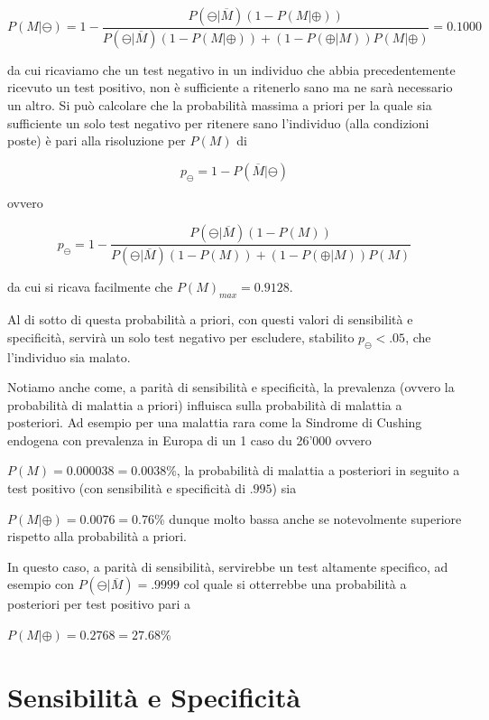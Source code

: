 \documentclass[11pt]{article}
\begin{document}
    \[
P(M|\ominus) = 1 - \frac{
P(\ominus|\overline{M})(1 - P(M|\oplus))
}{
P(\ominus|\overline{M})(1 - P(M|\oplus)) + (1 - P(\oplus|M))P(M|\oplus)
} = 0.1000
\]

    
    da cui ricaviamo che un test negativo in un individuo che abbia
precedentemente ricevuto un test positivo, non è sufficiente a ritenerlo
sano ma ne sarà necessario un altro. Si può calcolare che la probabilità
massima a priori per la quale sia sufficiente un solo test negativo per
ritenere sano l'individuo (alla condizioni poste) è pari alla
risoluzione per \(P(M)\) di

\begin{equation}\label{eq:massima1}
p_{\ominus} = 1 - P(\overline{M}|\ominus)
\end{equation}

ovvero

\begin{equation}\label{eq:massima2}
p_{\ominus} = 1 - \frac{
P(\ominus|\overline{M})(1 - P(M))
}{
P(\ominus|\overline{M})(1 - P(M)) + (1 - P(\oplus|M))P(M)
}
\end{equation}

    da cui si ricava facilmente che \(P(M)_{max} = 0.9128\).

    
    Al di sotto di questa probabilità a priori, con questi valori di
sensibilità e specificità, servirà un solo test negativo per escludere,
stabilito \(p_{\ominus}<.05\), che l'individuo sia malato.

    Notiamo anche come, a parità di sensibilità e specificità, la prevalenza
(ovvero la probabilità di malattia a priori) influisca sulla probabilità
di malattia a posteriori. Ad esempio per una malattia rara come la
Sindrome di Cushing endogena con prevalenza in Europa di un 1 caso du
26'000 \cite{cushing} ovvero

    \(P(M)=0.000038=0.0038%
\)\%, la probabilità di malattia a posteriori in seguito a test positivo
(con sensibilità e specificità di \(.995\)) sia

    
    \(P(M|\oplus)=0.0076=0.76%
\)\% dunque molto bassa anche se notevolmente superiore rispetto alla
probabilità a priori.

    
    In questo caso, a parità di sensibilità, servirebbe un test altamente
specifico, ad esempio con \(P(\ominus|\overline{M})=.9999\) col quale si
otterrebbe una probabilità a posteriori per test positivo pari a

    \(P(M|\oplus)=0.2768=27.68%
\)\%

    
    \hypertarget{sensibilituxe0-e-specificituxe0}{%
\section{Sensibilità e
Specificità}\label{sensibilituxe0-e-specificituxe0}}
\end{document}

